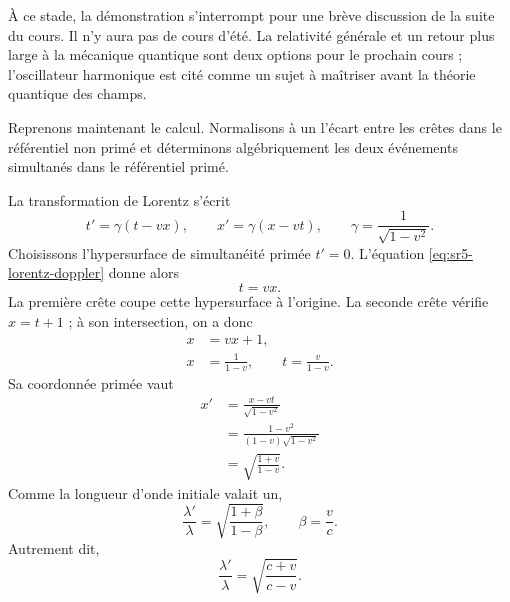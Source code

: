À ce stade, la démonstration s’interrompt pour une brève discussion de la suite du cours. Il n’y aura pas de cours d’été. La relativité générale et un retour plus large à la mécanique quantique sont deux options pour le prochain cours ; l’oscillateur harmonique est cité comme un sujet à maîtriser avant la théorie quantique des champs.

\begin{classroomqa}\end{classroomqa}

\begin{classroomqa}\end{classroomqa}

Reprenons maintenant le calcul. Normalisons à un l’écart entre les crêtes dans le référentiel non primé et déterminons algébriquement les deux événements simultanés dans le référentiel primé.

La transformation de Lorentz s’écrit \begin{equation}
t'=\gamma(t-vx),
\qquad
x'=\gamma(x-vt),
\qquad
\gamma=\frac{1}{\sqrt{1-v^2}}.
\label{eq:sr5-lorentz-doppler}
\end{equation}Choisissons l’hypersurface de simultanéité primée \(t'=0\). L’équation \eqref{eq:sr5-lorentz-doppler} donne alors \begin{equation}
t=vx.
\label{eq:sr5-primed-simultaneity}
\end{equation}La première crête coupe cette hypersurface à l’origine. La seconde crête vérifie \(x=t+1\) ; à son intersection, on a donc \begin{align}
x&=vx+1,\\
x&=\frac{1}{1-v},
\qquad
t=\frac{v}{1-v}.
\end{align}Sa coordonnée primée vaut \begin{align}
x'
&=\frac{x-vt}{\sqrt{1-v^2}}\\
&=\frac{1-v^2}{(1-v)\sqrt{1-v^2}}\\
&=\sqrt{\frac{1+v}{1-v}}.
\end{align}Comme la longueur d’onde initiale valait un, \begin{equation}
\boxed{
\frac{\lambda'}{\lambda}
=
\sqrt{\frac{1+\beta}{1-\beta}}
},
\qquad
\beta=\frac{v}{c}.
\label{eq:sr5-doppler}
\end{equation}Autrement dit, \begin{equation}
\frac{\lambda'}{\lambda}
=
\sqrt{\frac{c+v}{c-v}}.
\end{equation}


